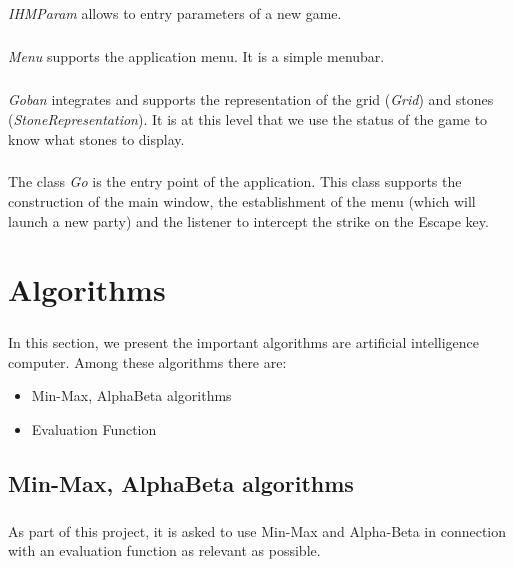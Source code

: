 \documentclass[a4paper,12pt]{report}
\begin{document}
	  \paragraph*{}
	      \textit{IHMParam} allows to entry parameters of a new game.

	  \paragraph*{}
	      \textit{Menu} supports the application menu. It is a simple menubar.
	   
	  \paragraph*{}
	      \textit{Goban} integrates and supports the representation of the grid (\textit{Grid}) and stones (\textit{StoneRepresentation}).
	      It is at this level that we use the status of the game to know what stones to display.
	  \paragraph*{}
	      The class \textit{Go} is the entry point of the application. This class supports the construction of the main window, the establishment of the menu
	      (which will launch a new party) and the listener to intercept the strike on the Escape key.

\chapter{Algorithms}
     \paragraph*{}
     In this section, we present the important algorithms are artificial intelligence computer. Among these algorithms there are:
      \begin{itemize}
	  \item Min-Max, AlphaBeta algorithms
	  \item Evaluation Function
      \end{itemize}

      \section{Min-Max, AlphaBeta algorithms}
	  \paragraph*{}
	  As part of this project, it is asked to use Min-Max and Alpha-Beta in connection with an evaluation function as relevant as possible.
\end{document}
